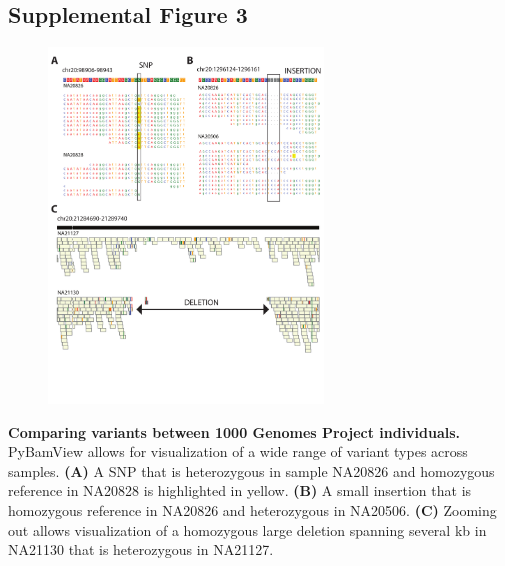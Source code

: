 \subsection{Supplemental Figure 3}
\begin{figure}[h!]
\centering
\label{fig:pbvsup3}
\includegraphics[width=0.65\textwidth]{Figures/App2/SuppFig3.pdf}
\end{figure}
\textbf{Comparing variants between 1000 Genomes Project individuals.} PyBamView allows for visualization of a wide range of variant types across samples. \textbf{(A)} A SNP that is heterozygous in sample NA20826 and homozygous reference in NA20828 is highlighted in yellow. \textbf{(B)} A small insertion that is homozygous reference in NA20826 and heterozygous in NA20506. \textbf{(C)} Zooming out allows visualization of a homozygous large deletion spanning several kb in NA21130 that is heterozygous in NA21127.

\pagebreak
